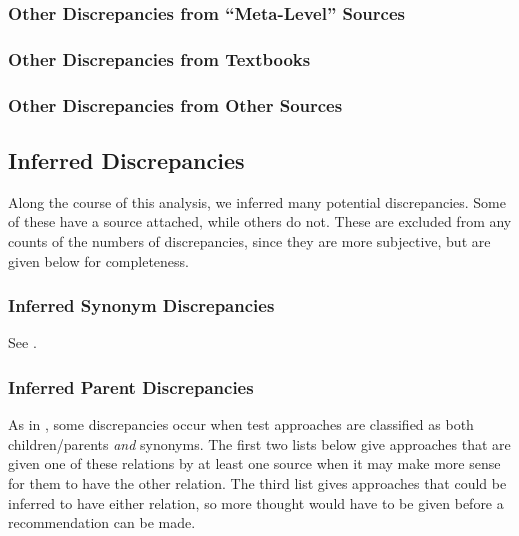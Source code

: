 \subsubsection{Other Discrepancies from ``Meta-Level'' Sources}


\ifnotpaper\subsubsection{Other Discrepancies from Textbooks}
      \fi

\subsubsection{Other Discrepancies from Other Sources}


\ifnotpaper
      \subsection{Inferred Discrepancies}
      Along the course of this analysis, we inferred many potential discrepancies.
      Some of these have a source attached, while others do not. These are excluded
      from any counts of the numbers of discrepancies, since they are more
      subjective, but are given below for completeness.

      \subsubsection{Inferred Synonym Discrepancies}
      See .

      \begin{enumerate}
            
      \end{enumerate}

      \subsubsection{Inferred Parent Discrepancies}
      As in , some discrepancies occur when test approaches
      are classified as both children/parents \emph{and} synonyms. The first two
      lists below give approaches that are given one of these relations by at
      least one source when it may make more sense for them to have the other
      relation. The third list gives approaches that could be inferred to have
      either relation, so more thought would have to be given before a
      recommendation can be made.

